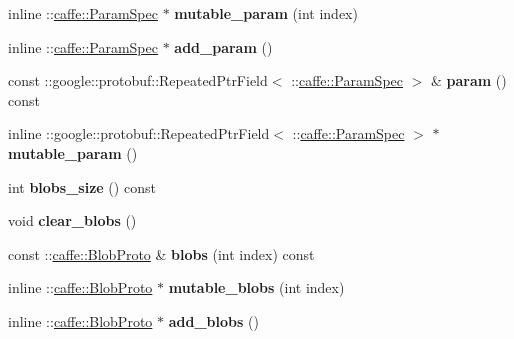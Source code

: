 \begin{DoxyCompactItemize}
inline \+::\mbox{\hyperlink{classcaffe_1_1_param_spec}{caffe\+::\+Param\+Spec}} $\ast$ {\bfseries mutable\+\_\+param} (int index)
\item 
\mbox{\label{classcaffe_1_1_layer_parameter_ac1ff0e863f9d0d0a3211ebb78131bcc6}} 
inline \+::\mbox{\hyperlink{classcaffe_1_1_param_spec}{caffe\+::\+Param\+Spec}} $\ast$ {\bfseries add\+\_\+param} ()
\item 
\mbox{\label{classcaffe_1_1_layer_parameter_ab4b3b1ccc89fd8a209f65f4a1e531073}} 
const \+::google\+::protobuf\+::\+Repeated\+Ptr\+Field$<$ \+::\mbox{\hyperlink{classcaffe_1_1_param_spec}{caffe\+::\+Param\+Spec}} $>$ \& {\bfseries param} () const
\item 
\mbox{\label{classcaffe_1_1_layer_parameter_a8058418cc3031940f19b7b0141ae6925}} 
inline \+::google\+::protobuf\+::\+Repeated\+Ptr\+Field$<$ \+::\mbox{\hyperlink{classcaffe_1_1_param_spec}{caffe\+::\+Param\+Spec}} $>$ $\ast$ {\bfseries mutable\+\_\+param} ()
\item 
\mbox{\label{classcaffe_1_1_layer_parameter_af6e1be0ac93c361c398e01ff30d880c6}} 
int {\bfseries blobs\+\_\+size} () const
\item 
\mbox{\label{classcaffe_1_1_layer_parameter_afa1299241ea3754f3d3675dfc7b7b3cd}} 
void {\bfseries clear\+\_\+blobs} ()
\item 
\mbox{\label{classcaffe_1_1_layer_parameter_a3d1f8a4d8c21067bd20fb717fa6cfebc}} 
const \+::\mbox{\hyperlink{classcaffe_1_1_blob_proto}{caffe\+::\+Blob\+Proto}} \& {\bfseries blobs} (int index) const
\item 
\mbox{\label{classcaffe_1_1_layer_parameter_a4298cf9f82f97c93ee28a5dbb764f4f2}} 
inline \+::\mbox{\hyperlink{classcaffe_1_1_blob_proto}{caffe\+::\+Blob\+Proto}} $\ast$ {\bfseries mutable\+\_\+blobs} (int index)
\item 
\mbox{\label{classcaffe_1_1_layer_parameter_a052ade37d74137d9f56e4663e97a4a69}} 
inline \+::\mbox{\hyperlink{classcaffe_1_1_blob_proto}{caffe\+::\+Blob\+Proto}} $\ast$ {\bfseries add\+\_\+blobs} ()

\end{DoxyCompactItemize}
